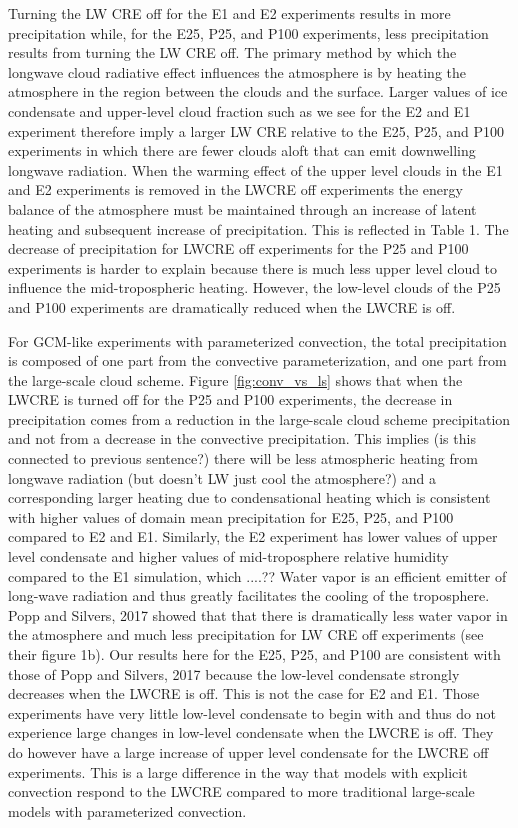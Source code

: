 \documentclass[draft]{agujournal2019}
\begin{document}
Turning the LW CRE off for the E1 and E2 experiments results in more precipitation while, 
for the E25, P25, and P100 experiments, less precipitation results from turning the LW CRE off.  
The primary method by which the longwave cloud radiative effect influences the atmosphere is by 
heating the atmosphere in the region between the clouds and the surface.  
Larger values of ice condensate and upper-level cloud fraction such as we see for the E2 and E1 experiment 
therefore imply a larger LW CRE relative to the E25, P25, and P100 experiments in which there are fewer clouds 
aloft that can emit downwelling longwave radiation.  When the warming effect of the upper level clouds 
in the E1 and E2 experiments is removed in the LWCRE off experiments the energy balance of the atmosphere 
must be maintained through an increase of latent heating and subsequent increase of precipitation.  This is 
reflected in Table 1.  The decrease of precipitation for LWCRE off experiments for the P25 and P100 experiments
is harder to explain because there is much less upper level cloud to influence the mid-tropospheric heating.  
However, the low-level clouds of the P25 and P100 experiments are dramatically reduced when the LWCRE is off.  

For GCM-like experiments with parameterized convection, the total precipitation is composed of one part from the 
convective parameterization, and one part from the large-scale cloud scheme.  Figure \ref{fig:conv_vs_ls} shows 
that when the LWCRE is turned off for the P25 and P100 experiments, the decrease in precipitation comes from 
a reduction in the large-scale cloud scheme precipitation and not from a decrease in the convective precipitation.       
This implies (is this connected to previous sentence?) there will be less atmospheric heating from 
longwave radiation (but doesn't LW just cool the atmosphere?) and a corresponding 
larger heating due to condensational heating which is consistent with higher values 
of domain mean precipitation for E25, P25, and P100 compared to E2 and E1.  Similarly, the E2 experiment has lower values 
of upper level condensate and higher values of mid-troposphere relative humidity compared to the E1 simulation, which ....??  
Water vapor is an efficient emitter of long-wave radiation and thus greatly facilitates the cooling of the troposphere.  
Popp and Silvers, 2017 showed that that there is dramatically less water vapor in the atmosphere and much less precipitation 
for LW CRE off experiments (see their figure 1b).  Our results here for the E25, P25, and P100 are consistent with 
those of Popp and Silvers, 2017 because the low-level condensate strongly decreases when the LWCRE is off.  This is not 
the case for E2 and E1.  Those experiments have very little low-level condensate to begin with and thus do not experience 
large changes in low-level condensate when the LWCRE is off.  They do however have a large increase of upper
level condensate for the LWCRE off experiments.   This is a large difference in the way that models with explicit convection 
respond to the LWCRE compared to more traditional large-scale models with parameterized convection.   
\end{document}
